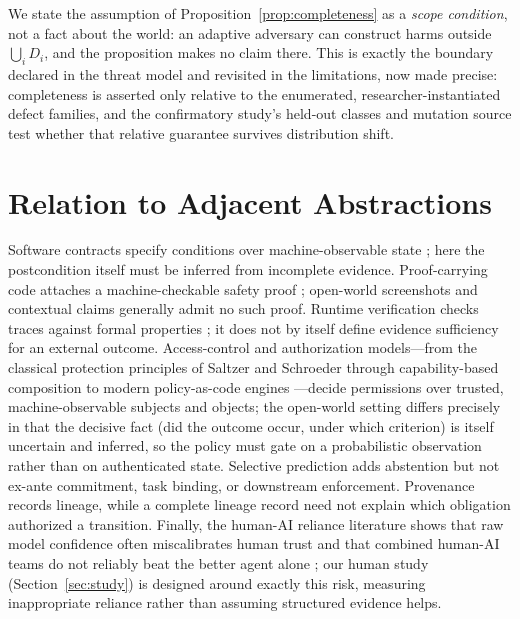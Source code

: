 \documentclass[sigconf,anonymous,review]{acmart}
\begin{document}
We state the assumption of Proposition~\ref{prop:completeness} as a \emph{scope condition}, not a fact about the world: an adaptive adversary can construct harms outside $\bigcup_iD_i$, and the proposition makes no claim there. This is exactly the boundary declared in the threat model and revisited in the limitations, now made precise: completeness is asserted only relative to the enumerated, researcher-instantiated defect families, and the confirmatory study's held-out classes and mutation source test whether that relative guarantee survives distribution shift.

\section{Relation to Adjacent Abstractions}
Software contracts specify conditions over machine-observable state \cite{meyer1997object}; here the postcondition itself must be inferred from incomplete evidence. Proof-carrying code attaches a machine-checkable safety proof \cite{necula1997proof}; open-world screenshots and contextual claims generally admit no such proof. Runtime verification checks traces against formal properties \cite{leucker2009brief}; it does not by itself define evidence sufficiency for an external outcome. Access-control and authorization models---from the classical protection principles of Saltzer and Schroeder \cite{saltzer1975protection} through capability-based composition \cite{miller2006capability} to modern policy-as-code engines \cite{opa2023}---decide permissions over trusted, machine-observable subjects and objects; the open-world setting differs precisely in that the decisive fact (did the outcome occur, under which criterion) is itself uncertain and inferred, so the policy must gate on a probabilistic observation rather than on authenticated state. Selective prediction adds abstention but not ex-ante commitment, task binding, or downstream enforcement. Provenance records lineage, while a complete lineage record need not explain which obligation authorized a transition. Finally, the human-AI reliance literature shows that raw model confidence often miscalibrates human trust and that combined human-AI teams do not reliably beat the better agent alone \cite{schemmer2023reliance,vaccaro2024combinations}; our human study (Section~\ref{sec:study}) is designed around exactly this risk, measuring inappropriate reliance rather than assuming structured evidence helps.
\end{document}
